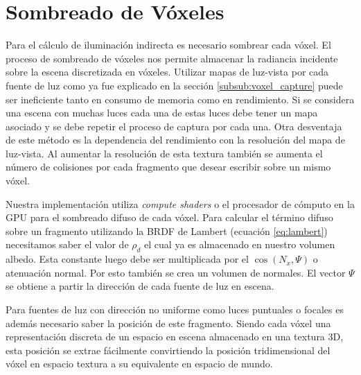 \section{Sombreado de Vóxeles} %
\label{sec:sombreado_de_voxeles}
Para el cálculo de iluminación indirecta es necesario sombrear cada vóxel. El proceso de sombreado de vóxeles nos permite almacenar la radiancia incidente sobre la escena discretizada en vóxeles. Utilizar mapas de luz-vista por cada fuente de luz como ya fue explicado en la sección \ref{subsub:voxel_capture} puede ser ineficiente tanto en consumo de memoria como en rendimiento. Si se considera una escena con muchas luces cada una de estas luces debe tener un mapa asociado y se debe repetir el proceso de captura por cada una. Otra desventaja de este método es la dependencia del rendimiento con la resolución del mapa de luz-vista. Al aumentar la resolución de esta textura también se aumenta el número de colisiones por cada fragmento que desear escribir sobre un mismo vóxel.

Nuestra implementación utiliza \emph{compute shaders} o el procesador de cómputo en la \ac{GPU} para el sombreado difuso de cada vóxel. Para calcular el término difuso sobre un fragmento utilizando la \ac{BRDF} de Lambert (ecuación \ref{eq:lambert}) necesitamos saber el valor de $\rho_{d}$ el cual ya es almacenado en nuestro volumen albedo. Esta constante luego debe ser multiplicada por el $\cos(N_{x}, \Psi)$ o atenuación normal. Por esto también se crea un volumen de normales. El vector $\Psi$ se obtiene a partir la dirección de cada fuente de luz en escena.

Para fuentes de luz con dirección no uniforme como luces puntuales o focales es además necesario saber la posición de este fragmento. Siendo cada vóxel una representación discreta de un espacio en escena almacenado en una textura 3D, esta posición se extrae fácilmente convirtiendo la posición tridimensional del vóxel en espacio textura a su equivalente en espacio de mundo.

